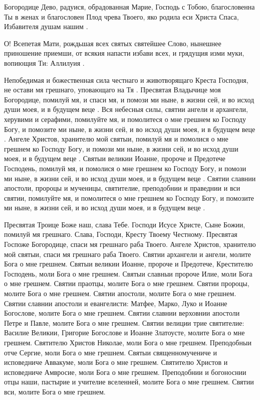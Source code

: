 \begin{mymulticols}


Богородице Дево, радуися, обрадованная Марие, Господь с Тобою, благословенна Ты в женах и благословен Плод чрева Твоего, яко родила еси Христа Спаса, Избавителя душам нашим .


О! Всепетая Мати, рождьшая всех святых святейшее Слово, нынешнее приношение приемши, от всякия напасти избави всех, и грядущия изми муки, вопиющия Ти: Аллилуия .


Непобедимая и божественная сила честнаго и животворящаго Креста Господня, не остави мя грешнаго, уповающаго на Тя . Пресвятая Владычице моя Богородице, помилуй мя, и спаси мя, и помози ми ныне, в жизни сей, и во исход души моея, и в будущем веце . Вся небесныя силы, святии ангели и архангели, херувими и серафими, помилуйте мя, и помолитеся о мне грешнем ко Господу Богу, и помозите ми ныне, в жизни сей, и во исход души моея, и в будущем веце . Ангеле Христов, хранителю мой святыи, помилуй мя и помолися о мне грешнем ко Господу Богу, и помози ми ныне, в жизни сей, и во исход души моея, и в будущем веце . Святыи великии Иоанне, пророче и Предотече Господень, помилуй мя, и помолися о мне грешнем ко Господу Богу, и помози ми ныне, в жизни сей, и во исход души моея, и в будущем веце . Святии славнии апостоли, пророцы и мученицы, святителие, преподобнии и праведнии и вси святии, помилуйте мя, и помолитеся о мне грешнем ко Господу Богу, и помозите ми ныне, в жизни сей, и во исход души моея, и в будущем веце . 




Пресвятая Троице Боже наш, слава Тебе. Господи Исусе Христе, Сыне Божии, помилуй мя грешнаго. Слава, Господи, Кресту Твоему Честному. Пресвятая Госпоже Богородице, спаси мя грешнаго раба Твоего. Ангеле Христов, хранителю мой святыи, спаси мя грешнаго раба Твоего. Святии архангели и ангели, молите Бога о мне грешнем. Святыи великии Иоанне, пророче и Предотече, Крестителю Господень, моли Бога о мне грешнем. Святыи славныи пророче Илие, моли Бога о мне грешнем. Святии праотцы, молите Бога о мне грешнем. Святии пророцы, молите Бога о мне грешнем. Святии апостоли, молите Бога о мне грешнем. Святии славнии апостоли и евангелисти: Матфее, Марко, Луко и Иоанне Богослове, молите Бога о мне грешнем. Святии славнии верховнии апостоли Петре и Павле, молите Бога о мне грешнем. Святии велиции трие святителие: Василие Великии, Григорие Богослове и Иоанне Златоусте, молите Бога о мне грешнем. Святителю Христов Николае, моли Бога о мне грешнем. Преподобныи отче Сергие, моли Бога о мне грешнем. Святыи священномучениче и исповедниче Аввакуме, моли Бога о мне грешнем. Святителю Христов и исповедниче Амвросие, моли Бога о мне грешнем. Преподобнии и богоноснии отцы наши, пастырие и учителие вселенней, молите Бога о мне грешнем. Святии вси, молите Бога о мне грешнем.



\end{mymulticols}
